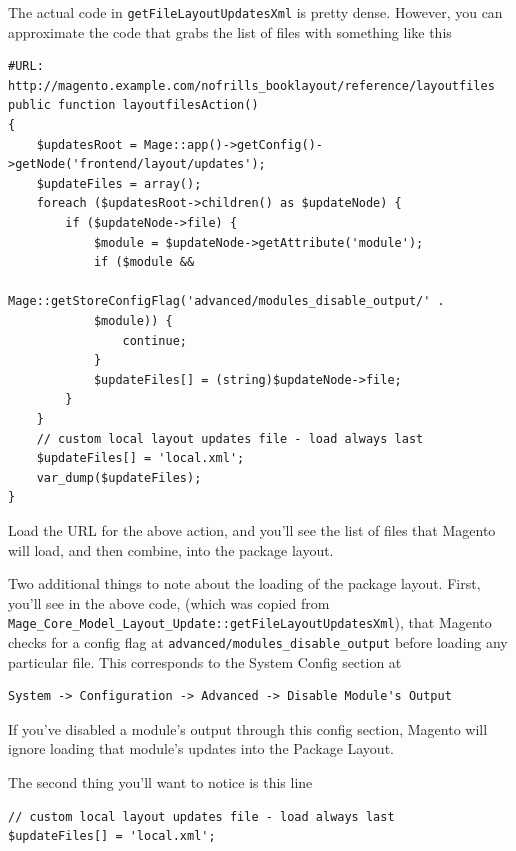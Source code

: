 \documentclass[oneside]{book}
\begin{document}
The actual code in \footnotesize\texttt{getFileLayoutUpdatesXml} \normalsize  is pretty dense. However, you can approximate the code that grabs the list of files with something like this

\begin{lstlisting}
#URL: http://magento.example.com/nofrills_booklayout/reference/layoutfiles
public function layoutfilesAction()
{
    $updatesRoot = Mage::app()->getConfig()->getNode('frontend/layout/updates');
    $updateFiles = array();
    foreach ($updatesRoot->children() as $updateNode) {
        if ($updateNode->file) {
            $module = $updateNode->getAttribute('module');
            if ($module &&
            Mage::getStoreConfigFlag('advanced/modules_disable_output/' .
            $module)) {
                continue;
            }
            $updateFiles[] = (string)$updateNode->file;
        }
    }
    // custom local layout updates file - load always last
    $updateFiles[] = 'local.xml';
    var_dump($updateFiles);
}

\end{lstlisting}


Load the URL for the above action, and you'll see the list of files that Magento will load, and then combine, into the package layout.

Two additional things to note about the loading of the package layout.  First, you'll see in the above code, (which was copied from \footnotesize\texttt{Mage\_Core\_Model\_Layout\_Update::getFileLayoutUpdatesXml}\normalsize), that Magento checks for a config flag at \footnotesize\texttt{advanced/modules\_disable\_output} \normalsize  before loading any particular file.  This corresponds to the System Config section at

\begin{lstlisting}
System -> Configuration -> Advanced -> Disable Module's Output

\end{lstlisting}


If you've disabled a module's output through this config section, Magento will ignore loading that module's updates into the Package Layout.

The second thing you'll want to notice is this line

\begin{lstlisting}
// custom local layout updates file - load always last
$updateFiles[] = 'local.xml';

\end{lstlisting}
\end{document}
